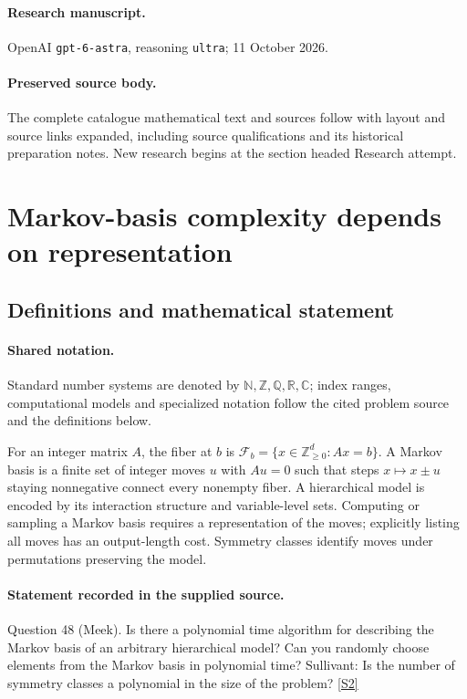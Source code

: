 \documentclass[11pt]{article}
\begin{document}
\paragraph{Research manuscript.} OpenAI \texttt{gpt-6-astra}, reasoning \texttt{ultra}; 11 October 2026.
\paragraph{Preserved source body.} The complete catalogue mathematical text and sources follow with layout and source links expanded, including source qualifications and its historical preparation notes. New research begins at the section headed Research attempt.

\section{Markov-basis complexity depends on representation}\label{statement}

\subsection{Definitions and mathematical statement}

\paragraph{Shared notation.}Standard number systems are denoted by $\mathbb N,\mathbb Z,\mathbb Q,\mathbb R,\mathbb C$; index ranges, computational models and specialized notation follow the cited problem source and the definitions below.


For an integer matrix $A$, the fiber at $b$ is $\mathcal F_b=\{x\in\mathbb Z_{\ge0}^d:Ax=b\}$. A Markov basis is a finite set of integer moves $u$ with $Au=0$ such that steps $x\mapsto x\pm u$ staying nonnegative connect every nonempty fiber. A hierarchical model is encoded by its interaction structure and variable-level sets. Computing or sampling a Markov basis requires a representation of the moves; explicitly listing all moves has an output-length cost. Symmetry classes identify moves under permutations preserving the model.
\paragraph{Statement recorded in the supplied source.}
Question 48 (Meek). Is there a polynomial time algorithm for describing the Markov basis of an arbitrary hierarchical model? Can you randomly choose elements from the Markov basis in polynomial time? Sullivant: Is the number of symmetry classes a polynomial in the size of the problem? \href{https://aimath.org/WWN/compalgstat/compalgstat.pdf}{[S2]}
\end{document}
